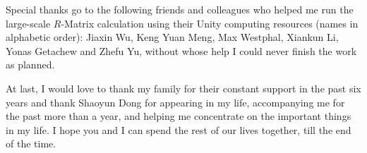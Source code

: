 \begin{acknowledgments}
	Special thanks go to the following friends and colleagues who helped me run the large-scale $R$-Matrix calculation using their Unity computing resources (names in alphabetic order): Jiaxin Wu, Keng Yuan Meng, Max Westphal, Xiankun Li, Yonas Getachew and Zhefu Yu, without whose help I could never finish the work as planned.
	
	At last, I would love to thank my family for their constant support in the past six years and thank Shaoyun Dong for appearing in my life, accompanying me for the past more than a year, and helping me concentrate on the important things in my life. I hope you and I can spend the rest of our lives together, till the end of the time.
	
\end{acknowledgments}